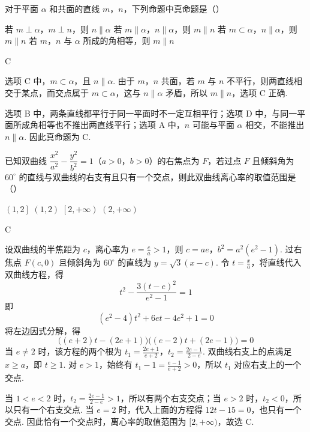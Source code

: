 \begin{problem}
对于平面 \(\alpha\) 和共面的直线 \(m\)，\(n\)，下列命题中真命题是（\quad）

\choices
    {若 \(m \perp \alpha\)，\(m \perp n\)，则 \(n \parallel \alpha\)}
    {若 \(m \parallel \alpha\)，\(n \parallel \alpha\)，则 \(m \parallel n\)}
    {若 \(m \subset \alpha\)，\(n \parallel \alpha\)，则 \(m \parallel n\)}
    {若 \(m\)，\(n\) 与 \(\alpha\) 所成的角相等，则 \(m \parallel n\)}
\end{problem}

\begin{answer}
C
\end{answer}

\begin{solution}
选项 C 中，\(m\subset\alpha\)，且 \(n\parallel\alpha\). 由于 \(m\)，\(n\) 共面，若 \(m\) 与 \(n\) 不平行，则两直线相交于某点，而交点属于 \(m\subset\alpha\)，这与 \(n\parallel\alpha\) 矛盾，所以 \(m\parallel n\)，选项 C 正确.

选项 B 中，两条直线都平行于同一平面时不一定互相平行；选项 D 中，与同一平面所成角相等也不推出两直线平行；选项 A 中，\(n\) 可能与平面 \(\alpha\) 相交，不能推出 \(n\parallel\alpha\). 因此真命题为 C.
\end{solution}

\begin{problem}
已知双曲线 \(\dfrac{x^2}{a^2} - \dfrac{y^2}{b^2} = 1\)（\(a > 0\)，\(b > 0\)）的右焦点为 \(F\)，若过点 \(F\) 且倾斜角为 \(60^{\circ}\) 的直线与双曲线的右支有且只有一个交点，则此双曲线离心率的取值范围是（\quad）

\choices
    {\(\left(1,2\right]\)}
    {\(\left(1,2\right)\)}
    {\(\left[2,+\infty\right)\)}
    {\(\left(2,+\infty\right)\)}
\end{problem}

\begin{answer}
C
\end{answer}

\begin{solution}
设双曲线的半焦距为 \(c\)，离心率为 \(e=\frac{c}{a}>1\)，则 \(c=ae\)，\(b^2=a^2(e^2-1)\). 过右焦点 \(F(c,0)\) 且倾斜角为 \(60^{\circ}\) 的直线为
\(y=\sqrt{3}(x-c)\). 令 \(t=\frac{x}{a}\)，将直线代入双曲线方程，得
\[
t^2-\frac{3(t-e)^2}{e^2-1}=1
\]
即
\[
(e^2-4)t^2+6et-4e^2+1=0
\]
将左边因式分解，得
\[
\bigl((e+2)t-(2e+1)\bigr)\bigl((e-2)t+(2e-1)\bigr)=0
\]
当 \(e\neq2\) 时，该方程的两个根为
\(t_1=\frac{2e+1}{e+2}\)，\(t_2=\frac{2e-1}{2-e}\).
双曲线右支上的点满足 \(x\geq a\)，即 \(t\geq1\). 对 \(e>1\)，始终有
\(t_1-1=\frac{e-1}{e+2}>0\)，所以 \(t_1\) 对应右支上的一个交点.

当 \(1<e<2\) 时，\(t_2=\frac{2e-1}{2-e}>1\)，所以有两个右支交点；当 \(e>2\) 时，\(t_2<0\)，所以只有一个右支交点. 当 \(e=2\) 时，代入上面的方程得 \(12t-15=0\)，也只有一个交点. 因此恰有一个交点时，离心率的取值范围为 \([2,+\infty)\)，故选 C.
\end{solution}

